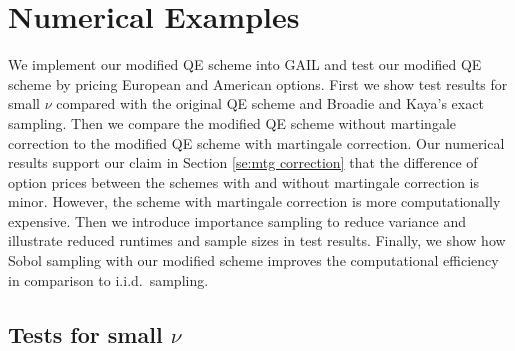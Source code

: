 \documentclass{ws-ijfe}
\begin{document}
\section{Numerical Examples}

We implement our modified QE scheme into GAIL and test our modified QE scheme by pricing European and American options. First we show test results for small $\nu$ compared with the original QE scheme and Broadie and Kaya's exact sampling. Then we compare the modified QE scheme without martingale correction to the modified QE scheme with martingale correction. Our numerical results support our claim in Section \ref{se:mtg correction} that the difference of option prices between the schemes with and without martingale correction is minor. However, the scheme with martingale correction is more computationally expensive. Then we introduce importance sampling to reduce variance and illustrate reduced runtimes and sample sizes in test results. Finally, we show how Sobol sampling with our modified scheme improves the computational efficiency in comparison to i.i.d.\ sampling.

\subsection{Tests for small $\nu$}
\end{document}
